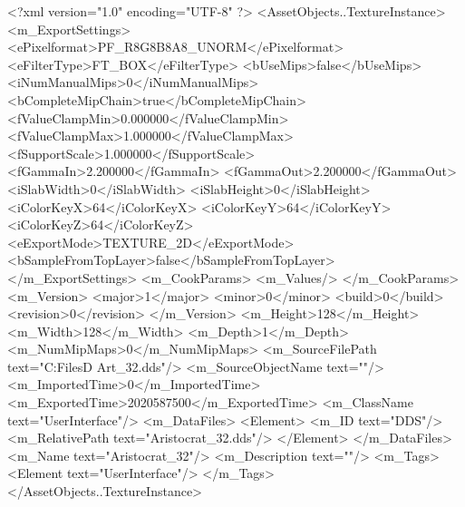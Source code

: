 <?xml version="1.0" encoding="UTF-8" ?>
<AssetObjects..TextureInstance>
	<m_ExportSettings>
		<ePixelformat>PF_R8G8B8A8_UNORM</ePixelformat>
		<eFilterType>FT_BOX</eFilterType>
		<bUseMips>false</bUseMips>
		<iNumManualMips>0</iNumManualMips>
		<bCompleteMipChain>true</bCompleteMipChain>
		<fValueClampMin>0.000000</fValueClampMin>
		<fValueClampMax>1.000000</fValueClampMax>
		<fSupportScale>1.000000</fSupportScale>
		<fGammaIn>2.200000</fGammaIn>
		<fGammaOut>2.200000</fGammaOut>
		<iSlabWidth>0</iSlabWidth>
		<iSlabHeight>0</iSlabHeight>
		<iColorKeyX>64</iColorKeyX>
		<iColorKeyY>64</iColorKeyY>
		<iColorKeyZ>64</iColorKeyZ>
		<eExportMode>TEXTURE_2D</eExportMode>
		<bSampleFromTopLayer>false</bSampleFromTopLayer>
	</m_ExportSettings>
	<m_CookParams>
		<m_Values/>
	</m_CookParams>
	<m_Version>
		<major>1</major>
		<minor>0</minor>
		<build>0</build>
		<revision>0</revision>
	</m_Version>
	<m_Height>128</m_Height>
	<m_Width>128</m_Width>
	<m_Depth>1</m_Depth>
	<m_NumMipMaps>0</m_NumMipMaps>
	<m_SourceFilePath text="C:\Users\Shadow\Desktop\Working Files\2D Art\Quarters\Aristocrat\Aristocrat_32.dds"/>
	<m_SourceObjectName text=""/>
	<m_ImportedTime>0</m_ImportedTime>
	<m_ExportedTime>2020587500</m_ExportedTime>
	<m_ClassName text="UserInterface"/>
	<m_DataFiles>
		<Element>
			<m_ID text="DDS"/>
			<m_RelativePath text="Aristocrat_32.dds"/>
		</Element>
	</m_DataFiles>
	<m_Name text="Aristocrat_32"/>
	<m_Description text=""/>
	<m_Tags>
		<Element text="UserInterface"/>
	</m_Tags>
</AssetObjects..TextureInstance>

